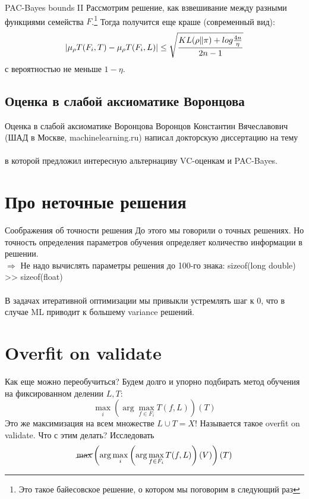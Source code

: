 \documentclass[14pt, fleqn, xcolor={dvipsnames, table}]{beamer}
\begin{document}
\begin{frame}{PAC-Bayes bounds II}
\small
Рассмотрим решение, как взвешивание между разными функциями семейства $F$.\footnote{Это такое байесовское решение, о котором мы поговорим в следующий раз} Тогда получится еще краше (современный вид):
$$
|\mu_\rho T(F_i, T) - \mu_\rho T(F_i, L)| \le \sqrt{KL(\rho \| \pi) + log \frac{4n}{\eta} \over 2n - 1}
$$
с вероятностью не меньше $1-\eta$.
\end{frame}

\subsection{Оценка в слабой аксиоматике Воронцова}
\begin{frame}{Оценка в слабой аксиоматике Воронцова}
Воронцов Константин Вячеславович (ШАД в Москве, machinelearning.ru) написал докторскую диссертацию на тему \\
 \\
\flushleft в которой предложил интересную альтернациву VC-оценкам и PAC-Bayes.
\end{frame}

\section{Про неточные решения}
\begin{frame}{Соображения об точности решения}
До этого мы говорили о точных решениях. Но точность определения параметров обучения определяет количество информации в решении. \\
$\Rightarrow$ Не надо вычислять параметры решения до 100-го знака: sizeof(long double) >> sizeof(float) \\
~\\
В задачах итеративной оптимизации мы привыкли устремлять шаг к 0, что в случае ML приводит к большему variance решений.
\end{frame}

\section{Overfit on validate}
\begin{frame}{Как еще можно переобучиться?}
Будем долго и упорно подбирать метод обучения на фиксированном делении $L, T$:
$$
\max_{i} \left(\arg\max_{f \in F_i} T(f, L)\right)(T)
$$
Это же максимизация на всем множестве $L \cup T = X$! Называется такое overfit on validate. Что с этим делать? Исследовать
$$
\cancel{\max} \left(\arg \max_{i} \left(\arg\max_{f \in F_i} T(f, L)\right)(V)\right)(T)
$$
\end{frame}
\end{document}
